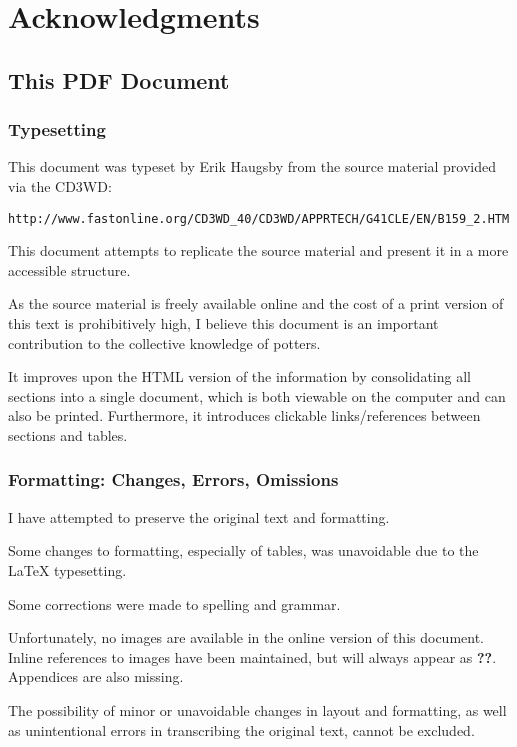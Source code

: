 \chapter*{Acknowledgments}
\section*{This PDF Document}
\subsection*{Typesetting}
This document was typeset by Erik Haugsby from the source material provided 
via the CD3WD:
\begin{verbatim}
http://www.fastonline.org/CD3WD_40/CD3WD/APPRTECH/G41CLE/EN/B159_2.HTM
\end{verbatim}
This document attempts to replicate the source material and present it in a 
more accessible structure.

As the source material is freely available online and the cost of a print 
version of this text is prohibitively high, I believe this document is an 
important contribution to the collective knowledge of potters. 

It improves upon the HTML version of the information by consolidating all 
sections into a single document, which is both viewable on the computer and can 
also be printed. Furthermore, it introduces clickable links/references between 
sections and tables.
\subsection*{Formatting: Changes, Errors, Omissions}
I have attempted to preserve the original text and formatting. 

Some changes to formatting, especially of tables, was unavoidable due to the 
LaTeX typesetting.

Some corrections were made to spelling and grammar.

Unfortunately, no images are available in the online version of this document. 
Inline references to images have been maintained, but will always appear as 
\textbf{??}. Appendices are also missing.

The possibility of minor or unavoidable changes in layout and formatting, as 
well as unintentional errors in transcribing the original text, cannot be 
excluded.

